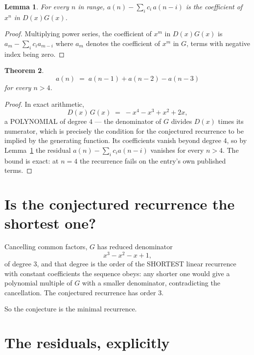 \documentclass[11pt,a4paper]{article}
\theoremstyle{plain}
\newtheorem{theorem}{Theorem}
\newtheorem{lemma}[theorem]{Lemma}
\theoremstyle{definition}
\begin{document}
\begin{lemma}\label{lem:key}
For every $n$ in range, $a(n)-\sum_i c_i\,a(n-i)$ is the coefficient of $x^{n}$ in
$D(x)G(x)$.
\end{lemma}

\begin{proof}
Multiplying power series, the coefficient of $x^{m}$ in $D(x)G(x)$ is
$a_m-\sum_i c_i a_{m-i}$ where $a_m$ denotes the coefficient of $x^{m}$ in $G$, terms with
negative index being zero.
\end{proof}

\begin{theorem}
\[
a(n)\;=\;a(n-1) + a(n-2) - a(n-3)
\]
for every $n>4$.
\end{theorem}

\begin{proof}
In exact arithmetic,
\[
D(x)\,G(x)\;=\;- x^{4} - x^{3} + x^{2} + 2 x,
\]
a POLYNOMIAL of degree $4$ --- the denominator of $G$ divides $D(x)$ times its numerator,
which is precisely the condition for the conjectured recurrence to be implied by the
generating function. Its coefficients vanish beyond degree $4$, so by
Lemma~\ref{lem:key} the residual $a(n)-\sum_ic_ia(n-i)$ vanishes for every
$n>4$. The bound is exact: at $n=4$ the recurrence fails on the entry's own published terms.
\end{proof}

\section{Is the conjectured recurrence the shortest one?}

Cancelling common factors, $G$ has reduced denominator
\[
x^{3} - x^{2} - x + 1,
\]
of degree $3$, and that degree is the order of the SHORTEST linear recurrence with
constant coefficients the sequence obeys: any shorter one would give a polynomial multiple of
$G$ with a smaller denominator, contradicting the cancellation. The conjectured recurrence has
order $3$.

So the conjecture is the minimal recurrence.

\section{The residuals, explicitly}
\end{document}
